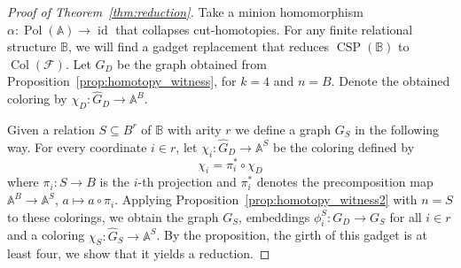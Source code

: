 \documentclass[oneside]{amsart}
\DeclareMathOperator{\col}{Col}
\newcommand{\str}[1]{\mathbb{#1}}
\newcommand{\cat}[1]{\mathcal{#1}}
\newcommand{\pol}{\operatorname{Pol}}
\newcommand{\CSP}{\operatorname{CSP}}
\DeclareMathOperator{\id}{id}
\begin{document}
\begin{proof}[Proof of Theorem~\ref{thm:reduction}]
Take a minion homomorphism $\alpha\colon \pol(\str A)\to \id$ that collapses cut-homotopies. For any finite relational structure $\str B$, we will find a gadget replacement that reduces $\CSP(\str B)$ to $\col(\cat F)$.
Let $G_D$ be the graph obtained from Proposition~\ref{prop:homotopy_witness}, for $k=4$ and $n=B$. Denote the obtained coloring by $\chi_D\colon \hat G_D\to\str A^B$.

Given a relation $S \subseteq B^r$ of $\mathbb B$ with arity $r$ we define a graph $G_S$ in the following way. For every coordinate $i \in r$, let $\chi_i\colon \hat G_D\to\str A^S$ be the coloring defined by
$$
\chi_i = \pi_i^*\circ \chi_D
$$
where $\pi_i\colon S\to B$ is the $i$-th projection and $\pi_i^*$ denotes the precomposition map $\str A^B\to\str A^S$, $a\mapsto a\circ\pi_i$.
Applying Proposition~\ref{prop:homotopy_witness2} with $n=S$ to these colorings, we obtain the graph $G_S$, embeddings $\phi_i^S\colon G_D\to G_S$ for all $i \in r$ and a coloring $\chi_S\colon \hat G_S\to \str A^S$. By the proposition, the girth of this gadget is at least four, we show that it yields a reduction.


\end{proof}
\end{document}
